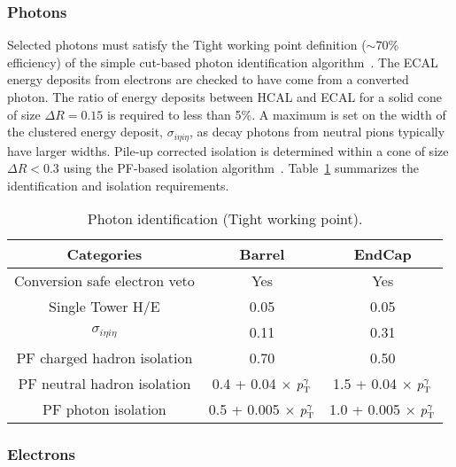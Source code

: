 \subsubsection{Photons\label{sec:recPhot}}
%
Selected photons must satisfy the Tight working point definition 
($\sim$70\% efficiency) of the simple cut-based photon identification
algorithm~\cite{ref:photon-id-egamma}. The ECAL energy deposits from electrons
are checked to have come from a converted photon. The ratio of energy deposits 
between HCAL and ECAL for a solid cone of size $\Delta R = 0.15$ is required to 
less than 5\%. A maximum is set on the width of the clustered energy deposit, 
$\sigma_{i\eta i\eta}$, as decay photons from neutral pions typically have larger
widths. Pile-up corrected isolation is determined within a cone of size $\Delta R < 0.3$ 
using the PF-based isolation algorithm~\cite{ref:photon-id-egamma}.
Table~\ref{tab:photon-id-egamma} summarizes the identification and isolation requirements.
\begin{table}[ht!]
  \caption{Photon identification (Tight working point).\label{tab:photon-id-egamma}}
  \centering
  \footnotesize
  \begin{tabular}{ ccc }
    \hline
    \hline
    Categories                    & Barrel                             & EndCap                             \\
    \hline
    Conversion safe electron veto & Yes                                & Yes                                \\
    Single Tower H/E              & 0.05                               & 0.05                               \\
    $\sigma_{i\eta i\eta}$        & 0.11                               & 0.31                               \\
    PF charged hadron isolation   & 0.70                               & 0.50                               \\
    PF neutral hadron isolation   & 0.4 + 0.04 $\times$ $p_{\mathrm{T}}^{\gamma}$  & 1.5 + 0.04 $\times$ $p_{\mathrm{T}}^{\gamma}$  \\
    PF photon isolation           & 0.5 + 0.005 $\times$ $p_{\mathrm{T}}^{\gamma}$ & 1.0 + 0.005 $\times$ $p_{\mathrm{T}}^{\gamma}$ \\
    \hline
    \hline
  \end{tabular}
\end{table}
\FloatBarrier
\subsubsection{Electrons\label{sec:recElectron}}

